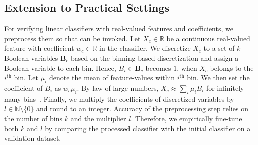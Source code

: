 	\subsection{Extension to Practical Settings}\label{fairness_fvgm_sec:practical}
	For verifying linear classifiers with real-valued features and coefficients, we preprocess them so that {\fvgm} can be invoked. Let $ X_c \in \mathbb{R} $ be a continuous real-valued feature with coefficient $ w_c \in \mathbb{R} $ in the classifier. We discretize $ X_c $ to a set of $ k $ Boolean variables $ \mathbf{B}_{c} $ based on the binning-based discretization and assign a Boolean variable to each bin. Hence, $ B_i \in \mathbf{B}_{c} $ becomes $ 1 $, when $ X_c $ belongs to the $ i^\text{th} $ bin. Let $ \mu_i $ denote the mean of feature-values within $ i^\text{th} $ bin. We then set the coefficient of $ B_i $ as $ w_c\mu_i $. By law of large numbers, $ X_c \approx \sum_i \mu_iB_i $ for infinitely many bins~\cite{grimmett2020probability}. Finally, we multiply the coefficients of discretized variables by $ l \in \mathbb{N} \setminus \{0\} $ and round to an integer. Accuracy of the preprocessing step relies on the number of bins $ k $ and the multiplier $ l $. Therefore, we empirically fine-tune both $ k $ and $ l $ by comparing  the processed classifier with the initial classifier on a validation dataset.
\begin{comment}
	\begin{figure}
		\centering
		\subfloat[Exploration tree of stochastic sub-set sum problem.]{	\texttt{[image: figures/exploration\_tree\_DP]}\label{fig:example_dp}}
		\subfloat[Bayesian network]{\texttt{[image: figures/example\_BN]}\label{fig:example_BN}}
		\subfloat[Exploration tree of stochastic sub-set sum problem with Bayesian network]{\texttt{[image: figures/exploration\_tree\_DP\_BN]}	\label{fig:example_dp_BN}
		}
		
	\end{figure}
\end{comment}


